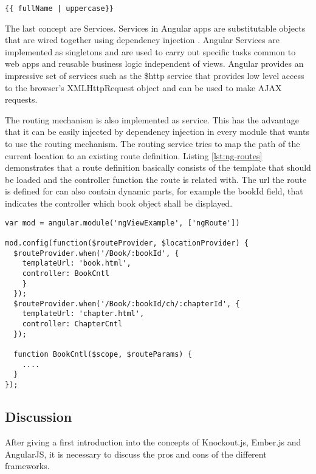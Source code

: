 \begin{lstlisting}[label=angular_filters,caption=Angular Filters]
 {{ fullName | uppercase}}
\end{lstlisting}

The last concept are Services.
Services in Angular apps are substitutable objects that are wired together using dependency injection . Angular Services are implemented as singletons and are used to carry out specific tasks common to web apps and reusable business logic independent of views. Angular provides an impressive set of services such as the \$http service that provides low level access to the browser's XMLHttpRequest object and can be used to make AJAX requests.

The routing mechanism is also implemented as service. This has the advantage that it can be easily injected by dependency injection in every module that wants to use the routing mechanism. The routing service tries to map the path of the current location to an existing route definition. Listing \ref{lst:ng-routes} demonstrates that a route definition basically consists of the template that should be loaded and the controller function the route is related with. The url the route is defined for can also contain dynamic parts, for example the bookId field, that indicates the controller which book object shall be displayed. 

\begin{lstlisting}[label=lst:ng-routes,caption=Route definition in AngularJS]
var mod = angular.module('ngViewExample', ['ngRoute'])
 
mod.config(function($routeProvider, $locationProvider) {
  $routeProvider.when('/Book/:bookId', {
    templateUrl: 'book.html',
    controller: BookCntl
    }
  });
  $routeProvider.when('/Book/:bookId/ch/:chapterId', {
    templateUrl: 'chapter.html',
    controller: ChapterCntl
  });
  
  function BookCntl($scope, $routeParams) {
	....
  }
});
\end{lstlisting}

\subsection{Discussion} \label{chap:fw-discussion}


After giving a first introduction into the concepts of Knockout.js, Ember.js and AngularJS,  it is necessary to discuss the pros and cons  of the different frameworks.

